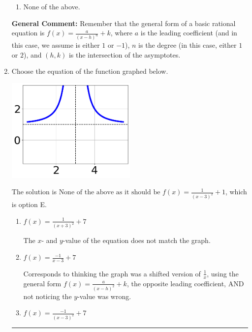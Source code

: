 \documentclass{extbook}[14pt]
\newcommand{\litem}[1]{\item #1

\rule{\textwidth}{0.4pt}}
\begin{document}
\begin{enumerate}
{\begin{enumerate}[label=\Alph*.]
\item None of the above.\end{enumerate}
\textbf{General Comment:} Remember that the general form of a basic rational equation is $ f(x) = \frac{a}{(x-h)^n} + k$, where $a$ is the leading coefficient (and in this case, we assume is either $1$ or $-1$), $n$ is the degree (in this case, either $1$ or $2$), and $(h, k)$ is the intersection of the asymptotes.
}
\litem{
Choose the equation of the function graphed below.

\begin{center}
    \includegraphics[width=0.5\textwidth]{../Figures/rationalGraphToEquationA.png}
\end{center}


The solution is \( \text{None of the above as it should be } f(x) = \frac{1}{(x - 3)^2} + 1 \), which is option E.\begin{enumerate}[label=\Alph*.]
\item \( f(x) = \frac{1}{(x + 3)^2} + 7 \)

The $x$- and $y$-value of the equation does not match the graph.
\item \( f(x) = \frac{-1}{x - 3} + 7 \)

Corresponds to thinking the graph was a shifted version of $\frac{1}{x}$, using the general form $f(x) = \frac{a}{(x-h)^2}+k$, the opposite leading coefficient, AND not noticing the $y$-value was wrong.
\item \( f(x) = \frac{-1}{(x - 3)^2} + 7 \)


\end{enumerate}}
\end{enumerate}
\end{document}
